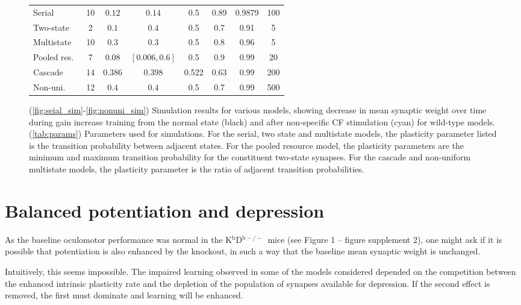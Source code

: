 \documentclass[10pt]{article}
\newcommand{\KO}{K$^\mathrm{b}$D$^{\mathrm{b}-/-}$}
\newcommand{\basefig}{Figure 1 -- figure supplement 2}
\begin{document}
\begin{figure}[p]
\begin{myenuma}
{\begin{tabular}{|l|c|c|c|c|c|c|c|}
    \cline{1-8}
    Serial       & 10 & $0.12$  & $0.14$        & 0.5   & 0.89 & 0.9879 & 100 \\
    Two-state    & 2  & $0.1$   & $0.4$         & 0.5   & 0.7  & 0.91   & 5   \\
    Multistate   & 10 & $0.3$   & $0.3$         & 0.5   & 0.8  & 0.96   & 5   \\
    Pooled res.\ & 7  & $0.08$  & $[0.006,0.6]$ & 0.5   & 0.9  & 0.99   & 20  \\
    Cascade      & 14 & $0.386$ & $0.398$       & 0.522 & 0.63 & 0.99   & 200  \\
    Non-uni.\    & 12 & $0.4$   & $0.4$         & 0.5   & 0.7  & 0.99   & 500  \\
    \cline{1-8}
  \end{tabular}}
  \end{myenuma}
  \caption[Simulation results for various models]{(\ref{fig:seial_sim}-\ref{fig:nonuni_sim}) Simulation results for various models, showing decrease in mean synaptic weight over time during gain increase training from the normal state (black) and after non-specific CF stimulation (cyan) for wild-type models.
  (\ref{tab:params}) Parameters used for simulations.
  For the serial, two state and multistate models, the plasticity parameter listed is the transition probability between adjacent states.
  For the pooled resource model, the plasticity parameters are the minimum and maximum transition probability for the constituent two-state synapses.
  For the cascade and non-uniform multistate models, the plasticity parameter is the ratio of adjacent transition probabilities.}\label{fig:sim_ChR2}
\end{figure}



\section{Balanced potentiation and depression}\label{sec:bal}


As the baseline oculomotor performance was normal in the \KO\ mice (see \basefig), one might ask if it is possible that potentiation is also enhanced by the knockout, in such a way that the baseline mean synaptic weight is unchanged.

Intuitively, this seems impossible.
The impaired learning observed in some of the models considered depended on the competition between the enhanced intrinsic plasticity rate and the depletion of the population of synapses available for depression.
If the second effect is removed, the first must dominate and learning will be enhanced.
\end{document}

